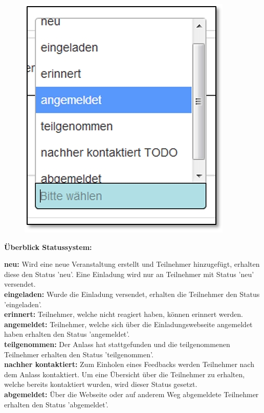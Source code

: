 \begin{figure}   %
  \vspace{-10pt}      %
  \begin{center}
    \includegraphics[width=.8\linewidth]{../chapters/10_CRM/pictures/10-2-5_Status.jpg}
  \end{center}
  \vspace{-20pt}
  \vspace{-10pt}
\end{figure}


\textbf{Überblick Statussystem:}

\textbf{neu:} Wird eine neue Veranstaltung erstellt und Teilnehmer hinzugefügt, erhalten diese den Status 'neu'. Eine Einladung wird nur an Teilnehmer mit Status 'neu' versendet.\\
\textbf{eingeladen:} Wurde die Einladung versendet, erhalten die Teilnehmer den Status 'eingeladen'.\\
\textbf{erinnert:} Teilnehmer, welche nicht reagiert haben, können erinnert werden.\\
\textbf{angemeldet:} Teilnehmer, welche sich über die Einladungswebseite angemeldet haben erhalten den Status 'angemeldet'.\\
\textbf{teilgenommen:} Der Anlass hat stattgefunden und die teilgenommenen Teilnehmer erhalten den Status 'teilgenommen'.\\
\textbf{nachher kontaktiert:} Zum Einholen eines Feedbacks werden Teilnehmer nach dem Anlass kontaktiert. Um eine Übersicht über die Teilnehmer zu erhalten, welche bereits kontaktiert wurden, wird dieser Status gesetzt.\\
\textbf{abgemeldet:} Über die Webseite oder auf anderem Weg abgemeldete Teilnehmer erhalten den Status 'abgemeldet'.


